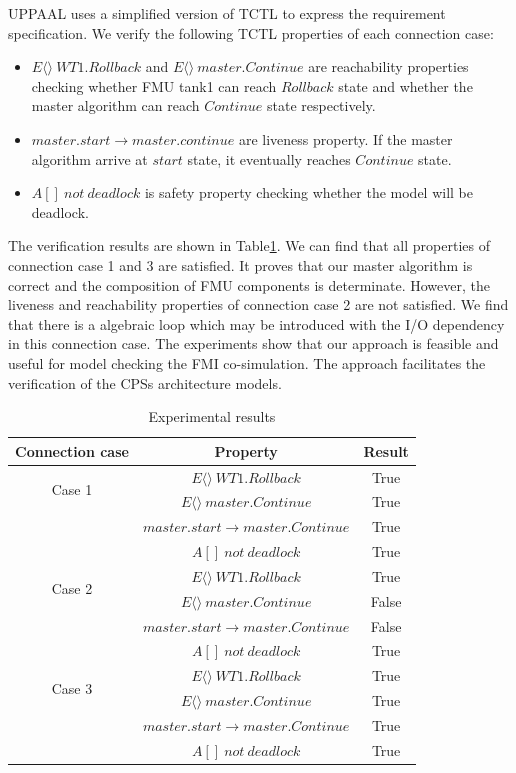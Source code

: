 UPPAAL uses a simplified version of TCTL \cite{BouchenebGR09} to express the requirement specification. We verify the following TCTL properties of each connection case:
\begin{itemize}
\item
$E\langle\rangle~WT1.Rollback$ and $E\langle\rangle~master.Continue$ are reachability properties checking whether FMU tank1 can reach $Rollback$ state and whether the master algorithm can reach $Continue$ state respectively.
\item
$master.start \rightarrow master.continue$ are liveness property. If the master algorithm arrive at $start$ state, it eventually reaches $Continue$ state.
\item 
$A[]~not~deadlock$ is safety property checking whether the model will be deadlock.
\end{itemize}

The verification results are shown in Table\ref{rs}. We can find that all properties of connection case 1 and 3 are satisfied. It proves that our master algorithm is correct and the composition of FMU components is determinate. However, the liveness and reachability properties of connection case 2 are not satisfied. We find that there is a algebraic loop which may be introduced with the I/O dependency in this connection case. The experiments show that our approach is feasible and useful for model checking the FMI co-simulation. The approach facilitates the verification of the CPSs architecture models.
\begin{table}
\caption{Experimental results}
\centering
\begin{tabular}{c c c} 
        \hline  
        Connection case & Property & Result\\
        \hline
        \multirow{2}{2.0cm}{Case 1}  
                & $E\langle\rangle~WT1.Rollback$ & True\\ 
                & $E\langle\rangle~master.Continue$ & True\\ 
                & $master.start\rightarrow master.Continue$ & True\\ 
                & $A[]~not~deadlock$ & True\\   
        \hline 
        \multirow{2}{2.0cm}{Case 2}  
                & $E\langle\rangle~WT1.Rollback$ & True\\ 
                & $E\langle\rangle~master.Continue$ & False\\ 
                & $master.start\rightarrow master.Continue$ & False\\ 
                & $A[]~not~deadlock$ & True\\   
        \hline 
        \multirow{2}{2.0cm}{Case 3}  
                & $E\langle\rangle~WT1.Rollback$ & True\\ 
                & $E\langle\rangle~master.Continue$ & True\\ 
                & $master.start \rightarrow master.Continue$ & True\\ 
                & $A[]~not~deadlock$ & True\\   
        \hline 
\end{tabular} 
\label{rs}
\end{table}




